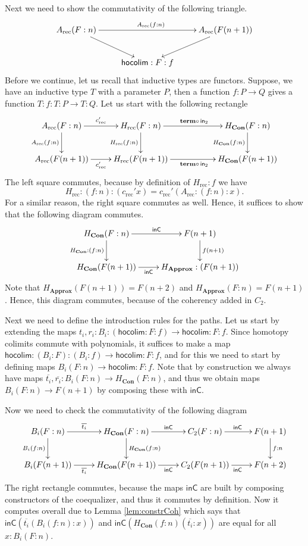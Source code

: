 \documentclass[a4paper,UKenglish]{lipics-v2016}
\newcommand{\Boperator}[1]{\mathsf{#1}}
\newcommand{\inn}{\Boperator{in}}
\newcommand{\comp}[0]{\circ \,}
\newcommand{\rec}[0]{\operatorname{rec}}
\newcommand{\term}[0]{\textbf{term}}
\newcommand{\Con}[0]{\textbf{Con}}
\newcommand{\Approx}[0]{\textbf{Approx}}
\newcommand{\inC}[0]{\Boperator{inC}}
\newcommand{\hocolim}[0]{\Boperator{hocolim}}
\begin{document}
Next we need to show the commutativity of the following triangle.
\[
\xymatrix
{
        A_{\rec}(F : n) \ar[rr]^{A_{\rec}(f : n)} \ar[dr] & & A_{\rec}(F(n+1)) \ar[dl] \\
        & \hocolim : F : f &
}
\]
Before we continue, let us recall that inductive types are functors.
Suppose, we have an inductive type $T$ with a parameter $P$, then a function $f : P \rightarrow Q$ gives a function $T : f : T : P \rightarrow T : Q$.
Let us start with the following rectangle
\[
\xymatrix
{
        A_{\rec}(F : n) \ar[r]^-{c_{\rec}'} \ar[d]_{A_{\rec}(f : n)} 
                & H_{\rec}(F : n) \ar[rr]^{\term \comp \inn_2} \ar[d]_{H_{\rec}(f : n)} &
                & H_{\Con}(F : n) \ar[d]_{H_{\Con}(f : n)}\\
        A_{\rec}(F(n+1)) \ar[r]_-{c_{\rec}'} 
                & H_{\rec}(F(n+1)) \ar[rr]_{\term \comp \inn_2} &
                & H_{\Con}(F(n+1))
}
\]
The left square commutes, because by definition of $H_{\rec} : f$ we have
\[
H_{\rec} :(f : n) : (c_{\rec}' x) = c_{\rec}' (A_{\rec} : (f : n) : x).
\]
For a similar reason, the right square commutes as well.
Hence, it suffices to show that the following diagram commutes.
\[
\xymatrix
{
        H_{\Con}(F : n) \ar[d]_{H_{\Con} : (f : n)} \ar[r]^-{\inC}
                & F(n+1) \ar[d]^{f(n+1)}\\
        H_{\Con}(F(n+1)) \ar[r]_-{\inC}
                & H_{\Approx} : (F(n+1))
}
\]
Note that $H_{\Approx}(F(n+1)) = F(n+2)$ and $H_{\Approx}(F : n) = F(n+1)$.
Hence, this diagram commutes, because of the coherency added in $C_2$.

Next we need to define the introduction rules for the paths.
Let us start by extending the maps $t_i, r_i : B_i : (\hocolim : F : f) \rightarrow \hocolim : F : f$.
Since homotopy colimits commute with polynomials, it suffices to make a map $\hocolim : (B_i : F) : (B_i : f)  \rightarrow \hocolim : F : f$, and for this we need to start by defining maps $B_i(F : n) \rightarrow \hocolim : F : f$.
Note that by construction we always have maps $\overline{t_i}, \overline{r_i} : B_i(F : n) \rightarrow H_{\Con}(F : n)$, and thus we obtain maps $B_i(F : n) \rightarrow F(n+1)$ by composing these with $\inC$.

Now we need to check the commutativity of the following diagram
\[
\xymatrix
{
        B_i(F : n) 
        \ar[r]^-{\overline{t_i}} 
        \ar[d]_{B_i(f : n)} 
        & 
        H_{\Con}(F : n) 
        \ar[r]^-{\inC}
        \ar[d]^{H_{\Con}(f : n)}  
        & 
        C_2(F : n)
        \ar[r]^{\inC}
        & 
        F(n+1) 
        \ar[d]^{f : n}\\
        B_i(F(n+1)) 
        \ar[r]_-{\overline{t_i}} 
        & 
        H_{\Con}(F(n+1)) 
        \ar[r]_-{\inC} 
        & 
        C_2(F(n+1))
        \ar[r]_{\inC} 
        & 
        F(n+2)
}
\]
The right rectangle commutes, because the maps $\inC$ are built by composing constructors of the coequalizer, and thus it commutes by definition.
Now it computes overall due to Lemma \ref{lem:constrCoh} which says that $\inC(\overline{t_i}(B_i(f : n) : x))$ and $\inC(H_{\Con}(f : n)(\overline{t_i} : x))$ are equal for all $x : B_i(F : n)$.
\end{document}
